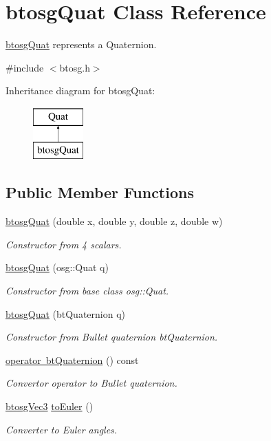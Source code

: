 \hypertarget{classbtosgQuat}{}\section{btosg\+Quat Class Reference}
\label{classbtosgQuat}


\mbox{\hyperlink{classbtosgQuat}{btosg\+Quat}} represents a Quaternion.  




{\ttfamily \#include $<$btosg.\+h$>$}

Inheritance diagram for btosg\+Quat\+:\begin{figure}[H]
\begin{center}
\leavevmode
\includegraphics[height=2.000000cm]{classbtosgQuat}
\end{center}
\end{figure}
\subsection*{Public Member Functions}
\begin{DoxyCompactItemize}
\item 
\mbox{\hyperlink{classbtosgQuat_a8ef8fc0d1503426d5e0ead87edfa5acf}{btosg\+Quat}} (double x, double y, double z, double w)
\begin{DoxyCompactList}\small\item\em Constructor from 4 scalars. \end{DoxyCompactList}\item 
\mbox{\hyperlink{classbtosgQuat_aa7646a03371b8aaa2caeba3f4b198ad6}{btosg\+Quat}} (osg\+::\+Quat q)
\begin{DoxyCompactList}\small\item\em Constructor from base class osg\+::\+Quat. \end{DoxyCompactList}\item 
\mbox{\hyperlink{classbtosgQuat_a9fc1530e0eb06c2432f1633bf08db8a2}{btosg\+Quat}} (bt\+Quaternion q)
\begin{DoxyCompactList}\small\item\em Constructor from Bullet quaternion bt\+Quaternion. \end{DoxyCompactList}\item 
\mbox{\hyperlink{classbtosgQuat_addfd68e2130ff8bb51c582524de5a345}{operator bt\+Quaternion}} () const
\begin{DoxyCompactList}\small\item\em Convertor operator to Bullet quaternion. \end{DoxyCompactList}\item 
\mbox{\hyperlink{classbtosgVec3}{btosg\+Vec3}} \mbox{\hyperlink{classbtosgQuat_aeda394d825b449ab87a77820aad1737d}{to\+Euler}} ()
\begin{DoxyCompactList}\small\item\em Converter to Euler angles. \end{DoxyCompactList}\end{DoxyCompactItemize}


